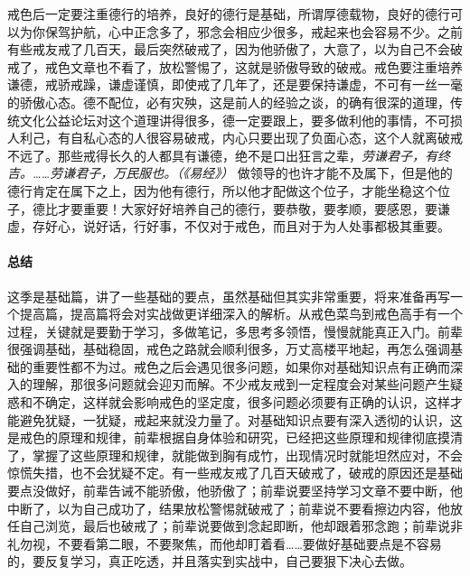 戒色后一定要注重德行的培养，良好的德行是基础，所谓厚德载物，良好的德行可以为你保驾护航，心中正念多了，邪念会相应少很多，戒起来也会容易不少。之前有些戒友戒了几百天，最后突然破戒了，因为他骄傲了，大意了，以为自己不会破戒了，戒色文章也不看了，放松警惕了，这就是骄傲导致的破戒。戒色要注重培养谦德，戒骄戒躁，谦虚谨慎，即使戒了几年了，还是要保持谦虚，不可有一丝一毫的骄傲心态。德不配位，必有灾殃，这是前人的经验之谈，的确有很深的道理，传统文化公益论坛对这个道理讲得很多，德一定要跟上，要多做利他的事情，不可损人利己，有自私心态的人很容易破戒，内心只要出现了负面心态，这个人就离破戒不远了。那些戒得长久的人都具有谦德，绝不是口出狂言之辈，\textit{劳谦君子，有终吉。……劳谦君子，万民服也。（《易经》）} 做领导的也许才能不及属下，但是他的德行肯定在属下之上，因为他有德行，所以他才配做这个位子，才能坐稳这个位子，德比才要重要！大家好好培养自己的德行，要恭敬，要孝顺，要感恩，要谦虚，存好心，说好话，行好事，不仅对于戒色，而且对于为人处事都极其重要。

\paragraph*{总结}

这季是基础篇，讲了一些基础的要点，虽然基础但其实非常重要，将来准备再写一个提高篇，提高篇将会对实战做更详细深入的解析。从戒色菜鸟到戒色高手有一个过程，关键就是要勤于学习，多做笔记，多思考多领悟，慢慢就能真正入门。前辈很强调基础，基础稳固，戒色之路就会顺利很多，万丈高楼平地起，再怎么强调基础的重要性都不为过。戒色之后会遇见很多问题，如果你对基础知识点有正确而深入的理解，那很多问题就会迎刃而解。不少戒友戒到一定程度会对某些问题产生疑惑和不确定，这样就会影响戒色的坚定度，很多问题必须要有正确的认识，这样才能避免犹疑，一犹疑，戒起来就没力量了。对基础知识点要有深入透彻的认识，这是戒色的原理和规律，前辈根据自身体验和研究，已经把这些原理和规律彻底摸清了，掌握了这些原理和规律，就能做到胸有成竹，出现情况时就能坦然应对，不会惊慌失措，也不会犹疑不定。有一些戒友戒了几百天破戒了，破戒的原因还是基础要点没做好，前辈告诫不能骄傲，他骄傲了；前辈说要坚持学习文章不要中断，他中断了，以为自己成功了，结果放松警惕就破戒了；前辈说不要看擦边内容，他放任自己浏览，最后也破戒了；前辈说要做到念起即断，他却跟着邪念跑；前辈说非礼勿视，不要看第二眼，不要聚焦，而他却盯着看……要做好基础要点是不容易的，要反复学习，真正吃透，并且落实到实战中，自己要狠下决心去做。

